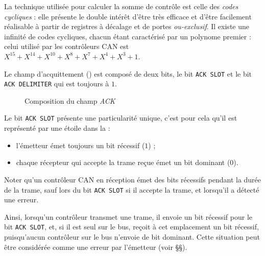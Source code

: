 La technique utilisée pour calculer la somme de contrôle est celle des \emph{codes cycliques} : elle présente le double intérêt d'être très efficace et d'être facilement réalisable à partir de registres à décalage et de portes \emph{ou-exclusif}. Il existe une infinité de codes cycliques, chacun étant caractérisé par un polynome premier : celui utilisé par les contrôleurs CAN est $X^{15}+X^{14}+X^{10}+X^8+X^7+X^4+X^3+1$.





Le champ d'acquittement () est composé de deux bits, le bit \texttt{ACK SLOT} et le bit \texttt{ACK DELIMITER} qui est toujours à $1$.

\begin{figure}[h]
  \centering
  \caption{Composition du champ \emph{ACK}}
\end{figure}

Le bit \texttt{ACK SLOT} présente une particularité unique, c'est pour cela qu'il est représenté par une étoile dans la  :
\begin{itemize}
  \item l'émetteur émet toujours un bit récessif ($1$) ;
  \item chaque récepteur qui accepte la trame reçue émet un bit dominant ($0$).
\end{itemize}

Noter qu'un contrôleur CAN en réception émet des bits récessifs pendant la durée de la trame, sauf lors du bit \texttt{ACK SLOT} si il accepte la trame, et lorsqu'il a détecté une erreur.

Ainsi, lorsqu'un contrôleur transmet une trame, il envoie un bit récessif pour le bit \texttt{ACK SLOT}, et, si il est seul sur le bus, reçoit à cet emplacement un bit récessif, puisqu'aucun contrôleur sur le bus n'envoie de bit dominant. Cette situation peut être considérée comme une erreur par l'émetteur (voir §§).

